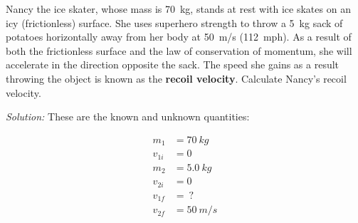 \documentclass[dvipsnames]{article}
\begin{document}
\begin{example} \label{W5BnBq} %
Nancy the ice skater, whose mass is \SI{70}{kg}, stands at rest with ice skates on an icy (frictionless) surface. She uses superhero strength to throw a \SI{5}{kg} sack of potatoes horizontally away from her body at \SI{50}{m/s} (\SI{112}{mph}). As a result of both the frictionless surface and the law of conservation of momentum, she will accelerate in the direction opposite the sack. The speed she gains as a result throwing the object is known as the \textbf{recoil velocity}. Calculate Nancy's recoil velocity.

\begin{center}

\vspace{5mm}

\end{center}
\end{example} 

\textit{Solution:} 
These are the known and unknown quantities:

\begin{align*}
    m_1 &= \SI{70}{kg} \\[1ex]
    v_{1i} &= 0 \\[1ex]
    m_2 &= \SI{5.0}{kg} \\[1ex]
    v_{2i} &= 0 \\[1ex]
    v_{1f} &=\ ? \\[1ex]
    v_{2f} &= \SI{50}{m/s}
\end{align*}
\end{document}
